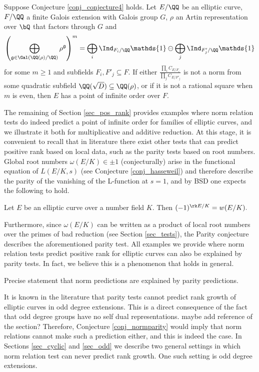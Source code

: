 \begin{thm}\cite[Theorem 33]{DEW1}
    Suppose Conjecture \ref{conj_conjecture4} holds. Let $E/\QQ$ be an elliptic curve, $F/\QQ$ a finite Galois extension with Galois group $G$, $\rho$ an Artin representation over $\bQ$ that factors through $G$ and 
    $$\left(\bigoplus_{\mathfrak{g}\in\Gal(\QQ(\rho)/\QQ)}\rho^{\mathfrak{g}}\right)^m=\bigoplus_i\Ind_{F_i/\QQ}\mathds{1}\ominus\bigoplus_j\Ind_{F'_j/\QQ}\mathds{1}$$
    for some $m\geq 1$ and subfields $F_i,F'_j\subseteq F$. If either $\frac{\prod_i C_{E/F_i}}{\prod_j C_{E/F'_j}}$ is not a norm from some quadratic subfield $\QQ(\sqrt{D})\subseteq\QQ(\rho)$, or if it is not a rational square when $m$ is even, then $E$ has a point of infinite order over $F$.
\end{thm}

The remaining of Section \ref{sec_pos_rank} provides examples where norm relation tests do indeed predict a point of infinite order for families of elliptic curves, and we illustrate it both for multiplicative and additive reduction. At this stage, it is convenient to recall that in literature there exist other tests that can predict positive rank based on local data, such as the parity tests based on root numbers. Global root numbers $\omega(E/K)\in{\pm1}$ (conjecturally) arise in the functional equation of $L(E/K,s)$ (see Conjecture \ref{conj_hasseweil}) and therefore describe the parity of the vanishing of the L-function at $s=1$, and by BSD one expects the following to hold.

\begin{conj}\label{conj_parity}
    Let $E$ be an elliptic curve over a number field $K$. Then
    $(-1)^{\rk E / K} = w(E / K).$
\end{conj}

Furthermore, since $\omega(E/K)$ can be written as a product of local root numbers over the primes of bad reduction (see Section \ref{sec_tests}), the Parity conjecture describes the aforementioned parity test. All examples we provide where norm relation tests predict positive rank for elliptic curves can also be explained by parity tests. In fact, we believe this is a phenomenon that holds in general.

\begin{conj}\label{conj_normparity}
    {\color{red} Precise statement that norm predictions are explained by parity predictions.}
\end{conj}

It is known in the literature that parity tests cannot predict rank growth of elliptic curves in odd degree extensions. This is a direct consequence of the fact that odd degree groups have no self dual representations. {\color{red} maybe add reference of the section?} Therefore, Conjecture \ref{conj_normparity} would imply that norm relations cannot make such a prediction either, and this is indeed the case. In Sections \ref{sec_cyclic} and \ref{sec_odd} we describe two general settings in which norm relation test can never predict rank growth. One such setting is odd degree extensions.

